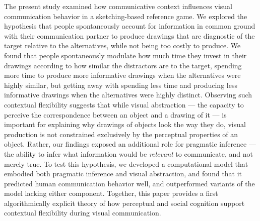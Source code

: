 \documentclass[9pt,twocolumn,twoside]{pnas-new}
\begin{document}
The present study examined how communicative context influences visual communication behavior in a sketching-based reference game. 
We explored the hypothesis that people spontaneously account for information in common ground with their communication partner to produce drawings that are diagnostic of the target relative to the alternatives, while not being too costly to produce. 
We found that people spontaneously modulate how much time they invest in their drawings according to how similar the distractors are to the target, spending more time to produce more informative drawings when the alternatives were highly similar, but getting away with spending less time and producing less informative drawings when the alternatives were highly distinct.
Observing such contextual flexibility suggests that while visual abstraction --- the capacity to perceive the correspondence between an object and a drawing of it --- is important for explaining why drawings of objects look the way they do, visual production is not constrained exclusively by the perceptual properties of an object.  
Rather, our findings exposed an additional role for pragmatic inference --- the ability to infer what information would be \textit{relevant} to communicate, and not merely true.
To test this hypothesis, we developed a computational model that embodied both pragmatic inference and visual abstraction, and found that it predicted human communication behavior well, and outperformed variants of the model lacking either component. 
Together, this paper provides a first algorithmically explicit theory of how perceptual and social cognition support contextual flexibility during visual communication.
\end{document}
